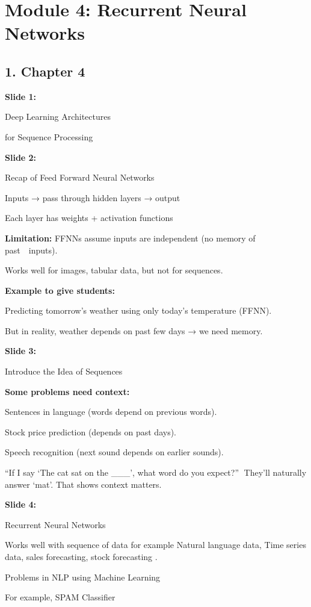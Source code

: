 \documentclass[11pt,a4paper]{article}
\begin{document}
\section{Module 4: Recurrent Neural Networks}


\subsection{1. Chapter 4}

\textbf{Slide 1:}

Deep Learning Architectures

for Sequence Processing

\textbf{Slide 2:}

Recap of Feed Forward Neural Networks

Inputs → pass through hidden layers → output

Each layer has weights + activation functions

\textbf{Limitation:}  FFNNs assume inputs are independent (no memory of past  inputs).

Works well for images, tabular data, but not for sequences.

\textbf{Example to give students:} 

Predicting tomorrow’s weather using only today’s temperature (FFNN).

But in reality, weather depends on past few days → we need memory.

\textbf{Slide 3:}

Introduce the Idea of Sequences

\textbf{Some problems need context:} 

Sentences in language (words depend on previous words).

Stock price prediction (depends on past days).

Speech recognition (next sound depends on earlier sounds).

“If I say ‘The cat sat on the \_\_\_’, what word do you expect?” They’ll naturally answer ‘mat’. That shows context matters.

\textbf{Slide 4:}

Recurrent Neural Networks

Works well with sequence of data for example Natural language data, Time series data, sales forecasting, stock forecasting .

Problems in NLP using Machine Learning

For example, SPAM Classifier
\end{document}
